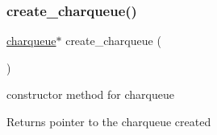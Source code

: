 \subsubsection{\texorpdfstring{create\+\_\+charqueue()}{create\_charqueue()}}
{\footnotesize\ttfamily \hyperlink{structcharqueue}{charqueue}$\ast$ create\+\_\+charqueue (\begin{DoxyParamCaption}{ }\end{DoxyParamCaption})}



constructor method for charqueue 

\begin{DoxyReturn}{Returns}
pointer to the charqueue created 
\end{DoxyReturn}
